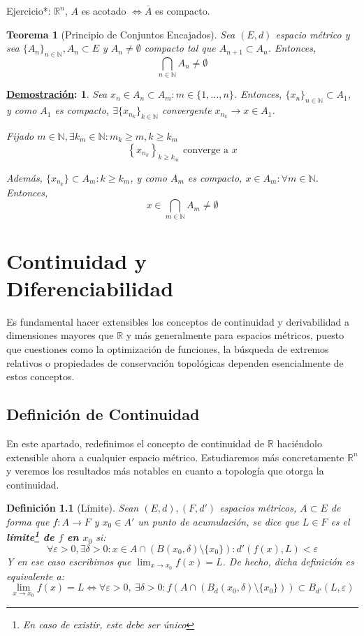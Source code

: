 \documentclass[10pt,a4paper,openright]{book}
\theoremstyle{break}
\newtheorem*{defi}{Definición}
\newtheorem*{theo}{Teorema}
\newtheorem*{demo}{\underline{Demostración}:}
\begin{document}
Ejercicio*:  $\mathbb{R}^n$, $A$ es acotado $\Leftrightarrow \bar{A}$ es compacto.

\begin{theo}[Principio de Conjuntos Encajados]
Sea $(E,d)$ espacio métrico y sea $\{A_n\}_{n \in \mathbb{N}}, A_n \subset E$ y $A_n \neq \emptyset$ compacto tal que $A_{n+1} \subset A_n$. Entonces, $$\bigcap_{n \in \mathbb{N}} A_n \neq \emptyset$$ 
\end{theo}

\begin{demo}
Sea $x_n \in A_n \subset A_m : m \in \{1,\ldots,n\}$. Entonces, $\{x_n\}_{n \in \mathbb{N}} \subset A_1$, y como $A_1$ es compacto, $\exists \{x_{n_k}\}_{k \in \mathbb{N}}$ convergente $x_{n_k} \to x \in A_1$.

Fijado $m \in \mathbb{N}, \exists k_m \in \mathbb{N} : m_k \geq m, k \geq k_m$
$$\left\lbrace x_{n_k} \right\rbrace_{k \geq k_m} \mbox{ converge a } x$$

Además, $\{x_{n_k}\} \subset A_m : k \geq k_m$, y como $A_m$  es compacto, $x \in A_m : \forall m \in \mathbb{N}$. Entonces, $$x \in \bigcap_{m \in \mathbb{N}} A_m \neq \emptyset$$
\end{demo}

\chapter{Continuidad y \\ Diferenciabilidad}
Es fundamental hacer extensibles los conceptos de continuidad y derivabilidad a dimensiones mayores que $\mathbb{R}$ y más generalmente para espacios métricos, puesto que cuestiones como la optimización de funciones, la búsqueda de extremos relativos o propiedades de conservación topológicas dependen esencialmente de estos conceptos.

\section{Definición de Continuidad}
En este apartado, redefinimos el concepto de continuidad de $\mathbb{R}$ haciéndolo extensible ahora a cualquier espacio métrico. Estudiaremos más concretamente $\mathbb{R}^n$ y veremos los resultados más notables en cuanto a topología que otorga la continuidad.

\begin{defi}[Límite]
Sean $(E,d),(F,d')$ espacios métricos, $A\subset E$ de forma que $f:A \to F$ y $x_0 \in A'$ un punto de acumulación, se dice que $L \in F$ es el \textbf{límite\footnote{En caso de existir, este debe ser único} de $f$ en $x_0$} si:
$$\forall \varepsilon > 0, \exists \delta > 0 : x \in A \cap (B(x_0, \delta) \setminus \{x_0\}) : d'(f(x), L) < \varepsilon$$
Y en ese caso escribimos que $ \displaystyle\lim_{x \to x_0} f(x) = L$. De hecho, dicha definición es equivalente a:
$$\lim_{x \to x_0} f(x) = L \Leftrightarrow \forall \varepsilon > 0,\ \exists \delta > 0 : f(A \cap (B_d(x_0, \delta) \setminus \{x_0\})) \subset B_{d'}(L, \varepsilon)$$
\end{defi}
\end{document}
